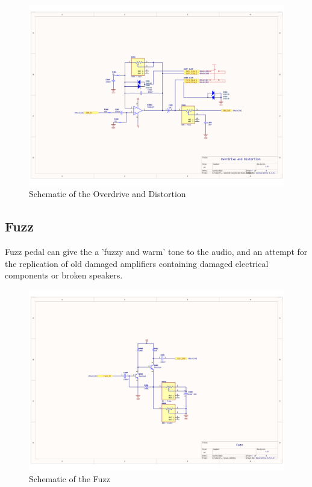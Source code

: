 \documentclass{article}
\begin{document}
                \begin{figure}[h!]
                    \centering
                    \includegraphics[scale=0.4]{odd.png}
                    \caption{Schematic of the Overdrive and Distortion}
                    \label{fig:enter-label}
                \end{figure}

            \subsection{Fuzz}
                Fuzz pedal can give the a 'fuzzy and warm' tone to the audio, and an attempt for the replication of old damaged amplifiers containing damaged electrical components or broken speakers.\\
                
                \begin{figure}
                    \centering
                    \includegraphics[scale=0.4]{fuzz.png}
                    \caption{Schematic of the Fuzz}
                    \label{fig:enter-label}
                \end{figure}
                
\end{document}
